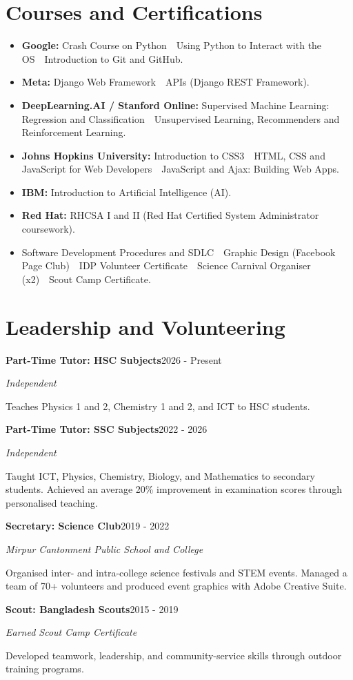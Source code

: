 \documentclass[10pt,a4paper]{article}
\newcommand{\entry}[2]{\needspace{3\baselineskip}\textbf{#1}\hfill #2\par}
\newcommand{\sub}[1]{\textit{#1}\par}
\newcommand{\sep}{\ \textbullet\ }
\begin{document}
\section{Courses and Certifications}
\begin{itemize}
  \item \textbf{Google:} Crash Course on Python\sep Using Python to Interact with the OS\sep Introduction to Git and GitHub.
  \item \textbf{Meta:} Django Web Framework\sep APIs (Django REST Framework).
  \item \textbf{DeepLearning.AI / Stanford Online:} Supervised Machine Learning: Regression and Classification\sep Unsupervised Learning, Recommenders and Reinforcement Learning.
  \item \textbf{Johns Hopkins University:} Introduction to CSS3\sep HTML, CSS and JavaScript for Web Developers\sep JavaScript and Ajax: Building Web Apps.
  \item \textbf{IBM:} Introduction to Artificial Intelligence (AI).
  \item \textbf{Red Hat:} RHCSA I and II (Red Hat Certified System Administrator coursework).
  \item Software Development Procedures and SDLC\sep Graphic Design (Facebook Page Club)\sep IDP Volunteer Certificate\sep Science Carnival Organiser (x2)\sep Scout Camp Certificate.
\end{itemize}

\section{Leadership and Volunteering}
\entry{Part-Time Tutor: HSC Subjects}{2026 - Present}
\sub{Independent}
Teaches Physics 1 and 2, Chemistry 1 and 2, and ICT to HSC students.\par
\vspace{2pt}
\entry{Part-Time Tutor: SSC Subjects}{2022 - 2026}
\sub{Independent}
Taught ICT, Physics, Chemistry, Biology, and Mathematics to secondary students. Achieved an average 20\% improvement in examination scores through personalised teaching.\par
\vspace{2pt}
\entry{Secretary: Science Club}{2019 - 2022}
\sub{Mirpur Cantonment Public School and College}
Organised inter- and intra-college science festivals and STEM events. Managed a team of 70+ volunteers and produced event graphics with Adobe Creative Suite.\par
\vspace{2pt}
\entry{Scout: Bangladesh Scouts}{2015 - 2019}
\sub{Earned Scout Camp Certificate}
Developed teamwork, leadership, and community-service skills through outdoor training programs.\par
\end{document}
